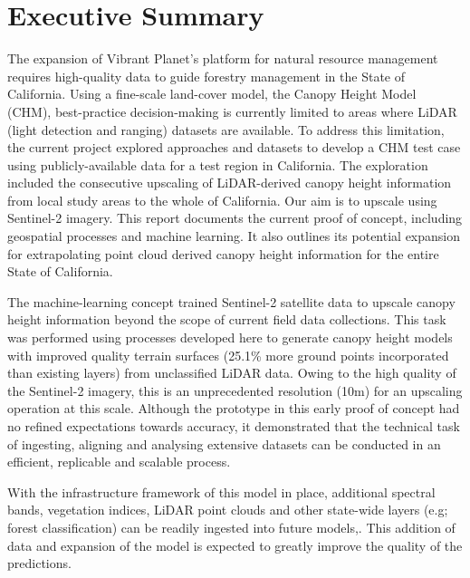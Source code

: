 \section*{Executive Summary}

The expansion of Vibrant Planet's platform for natural resource management requires high-quality data to guide forestry management in the State of California. Using a fine-scale land-cover model, the Canopy Height Model (CHM), best-practice decision-making is currently limited to areas where LiDAR (light detection and ranging) datasets are available.
To address this limitation, the current project explored approaches and datasets to develop a CHM test case using publicly-available data for a test region
in California.  The exploration included the consecutive upscaling of LiDAR-derived canopy height information from local study areas to the whole of California. Our aim is to upscale using Sentinel-2 imagery. This report documents the current
 proof of concept, including geospatial processes and machine learning. It also outlines its potential expansion for extrapolating point cloud derived canopy height information for the entire State of California.

 The machine-learning concept trained Sentinel-2 satellite data to upscale canopy height information beyond the
 scope of current field data collections. This task was performed using processes developed here to generate
 canopy height models with improved quality terrain surfaces (25.1\% more ground points incorporated than existing layers) from unclassified LiDAR data. Owing to the high quality
 of the Sentinel-2 imagery, this is an unprecedented resolution (10m) for an upscaling operation at this scale.
Although the prototype in this early proof of concept had no refined expectations towards accuracy, it demonstrated that the technical
task of ingesting, aligning and analysing extensive datasets can be conducted in an efficient, replicable and scalable process.

With the infrastructure framework of this model in place, additional spectral bands, vegetation indices, LiDAR point clouds and other state-wide layers
(e.g; forest classification) can be readily ingested into future models,. This addition of data and expansion of the model is
expected to greatly improve the quality of the predictions.

%
